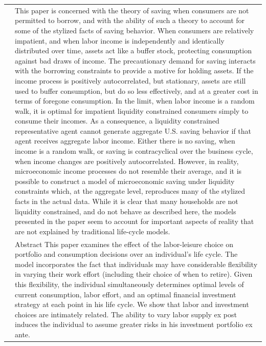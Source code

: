 \documentclass{article}
\begin{document}
\begin{tabular}{p{}p{}}
\cite{Deaton_1991} & This paper is concerned with the theory of saving when consumers are not permitted to borrow, and with the ability of such a theory to account for some of the stylized facts of saving behavior. When consumers are relatively impatient, and when labor income is independently and identically distributed over time, assets act like a buffer stock, protecting consumption against bad draws of income. The precautionary demand for saving interacts with the borrowing constraints to provide a motive for holding assets. If the income process is positively autocorrelated, but stationary, assets are still used to buffer consumption, but do so less effectively, and at a greater cost in terms of foregone consumption. In the limit, when labor income is a random walk, it is optimal for impatient liquidity constrained consumers simply to consume their incomes. As a consequence, a liquidity constrained representative agent cannot generate aggregate U.S. saving behavior if that agent receives aggregate labor income. Either there is no saving, when income is a random walk, or saving is contracyclical over the business cycle, when income changes are positively autocorrelated. However, in reality, microeconomic income processes do not resemble their average, and it is possible to construct a model of microeconomic saving under liquidity constraints which, at the aggregate level, reproduces many of the stylized facts in the actual data. While it is clear that many households are not liquidity constrained, and do not behave as described here, the models presented in the paper seem to account for important aspects of reality that are not explained by traditional life-cycle models. \\
\cite{Bodie_1992} & Abstract   This paper examines the effect of the labor-leisure choice on portfolio and consumption decisions over an individual's life cycle. The model incorporates the fact that individuals may have considerable flexibility in varying their work effort (including their choice of when to retire). Given this flexibility, the individual simultaneously determines optimal levels of current consumption, labor effort, and an optimal financial investment strategy at each point in his life cycle. We show that labor and investment choices are intimately related. The ability to vary labor supply ex post induces the individual to assume greater risks in his investment portfolio ex ante. \\

\end{tabular}
\end{document}
